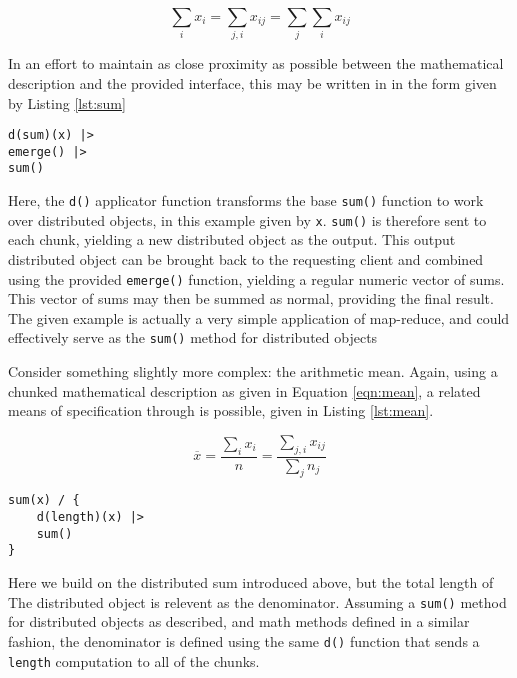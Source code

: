 \documentclass[letterpaper, inpress]{jds} %
\begin{document}
\begin{equation}\label{eqn:sum}
    \sum_i x_i= \sum_{j,i}x_{ij} = \sum_j\sum_i x_{ij}
\end{equation}

In an effort to maintain as close proximity as possible between the mathematical description and the provided interface, this may be written in  in the form given by Listing \ref{lst:sum}

\begin{lstlisting}[caption={Distributed summation with largescaler},label={lst:sum}]
d(sum)(x) |>
emerge() |>
sum()
\end{lstlisting}

Here, the \lstinline{d()} applicator function transforms the base \lstinline{sum()} function to work over distributed objects, in this example given by \lstinline{x}.
\lstinline{sum()} is therefore sent to each chunk, yielding a new distributed object as the output.
This output distributed object can be brought back to the requesting client and combined using the provided \lstinline{emerge()} function, yielding a regular  numeric vector of sums.
This vector of sums may then be summed as normal, providing the final result.
The given example is actually a very simple application of map-reduce, and could effectively serve as the \lstinline{sum()} method for distributed objects

Consider something slightly more complex: the arithmetic mean.
Again, using a chunked mathematical description as given in Equation \ref{eqn:mean}, a related means of specification through  is possible, given in Listing \ref{lst:mean}.

\begin{equation}\label{eqn:mean}
    \overline{x} = \frac{\sum_{i}x_{i}}{n} = \frac{\sum_{j,i}x_{ij}}{\sum_j n_j}
\end{equation}

\begin{lstlisting}[caption={Distributed arithmetic mean with largescaler},label={lst:mean}]
sum(x) / { 
	d(length)(x) |> 
	sum()
}
\end{lstlisting}

Here we build on the distributed sum introduced above, but the total length of The distributed object is relevent as the denominator.
Assuming a \lstinline{sum()} method for distributed objects as described, and math methods defined in a similar fashion, the denominator is defined using the same \lstinline{d()} function that sends a \lstinline{length} computation to all of the chunks.
\end{document}
